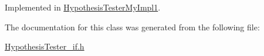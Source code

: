 Implemented in \hyperlink{class_hypothesis_tester_my_impl1_aea5e966244b773179262205369d496d9}{Hypothesis\-Tester\-My\-Impl1}.



The documentation for this class was generated from the following file\-:\begin{DoxyCompactItemize}
\item 
\hyperlink{_hypothesis_tester__if_8h}{Hypothesis\-Tester\-\_\-if.\-h}\end{DoxyCompactItemize}
